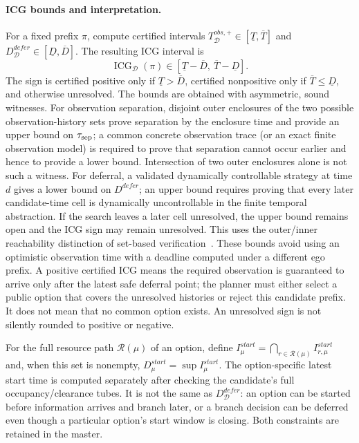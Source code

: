 \documentclass[letterpaper]{article} %
\begin{document}
\paragraph{ICG bounds and interpretation.}
For a fixed prefix $\pi$, compute certified intervals
$T_{\mathcal D}^{obs,+}\in[\underline T,\overline T]$ and
$D_{\mathcal D}^{defer}\in[\underline D,\overline D]$. The resulting ICG interval is
\begin{equation}
\operatorname{ICG}_{\mathcal D}(\pi)\in
[\underline T-\overline D,\ \overline T-\underline D].
\label{eq:icg-bounds}
\end{equation}
The sign is certified positive only if $\underline T>\overline D$, certified nonpositive only if $\overline T\leq\underline D$, and otherwise unresolved. The bounds are obtained with asymmetric, sound witnesses. For observation separation, disjoint outer enclosures of the two possible observation-history sets prove separation by the enclosure time and provide an upper bound on $\tau_{\rm sep}$; a common concrete observation trace (or an exact finite observation model) is required to prove that separation cannot occur earlier and hence to provide a lower bound. Intersection of two outer enclosures alone is not such a witness. For deferral, a validated dynamically controllable strategy at time $d$ gives a lower bound on $D^{defer}$; an upper bound requires proving that every later candidate-time cell is dynamically uncontrollable in the finite temporal abstraction. If the search leaves a later cell unresolved, the upper bound remains open and the ICG sign may remain unresolved. This uses the outer/inner reachability distinction of set-based verification~\citep{althoff2021set}. These bounds avoid using an optimistic observation time with a deadline computed under a different ego prefix. A positive certified ICG means the required observation is guaranteed to arrive only after the latest safe deferral point; the planner must either select a public option that covers the unresolved histories or reject this candidate prefix. It does not mean that no common option exists. An unresolved sign is not silently rounded to positive or negative.

For the full resource path $\mathcal R(\mu)$ of an option, define $I_\mu^{start}=\bigcap_{r\in\mathcal R(\mu)}I_{r,\mu}^{start}$ and, when this set is nonempty, $D_{\mu}^{start}=\sup I_\mu^{start}$. The option-specific latest start time is computed separately after checking the candidate's full occupancy/clearance tubes. It is not the same as $D_{\mathcal D}^{defer}$: an option can be started before information arrives and branch later, or a branch decision can be deferred even though a particular option's start window is closing. Both constraints are retained in the master.
\end{document}
